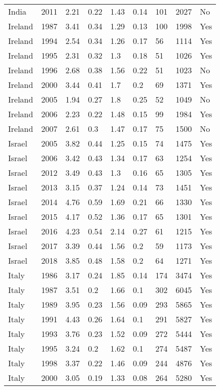 \begin{tabular}{lllllllll}
India & 2011 & 2.21 & 0.22 & 1.43 & 0.14 & 101 & 2027 & No \\ 
Ireland & 1987 & 3.41 & 0.34 & 1.29 & 0.13 & 100 & 1998 & Yes \\ 
Ireland & 1994 & 2.54 & 0.34 & 1.26 & 0.17 & 56 & 1114 & Yes \\ 
Ireland & 1995 & 2.31 & 0.32 & 1.3 & 0.18 & 51 & 1026 & Yes \\ 
Ireland & 1996 & 2.68 & 0.38 & 1.56 & 0.22 & 51 & 1023 & No \\ 
Ireland & 2000 & 3.44 & 0.41 & 1.7 & 0.2 & 69 & 1371 & Yes \\ 
Ireland & 2005 & 1.94 & 0.27 & 1.8 & 0.25 & 52 & 1049 & No \\ 
Ireland & 2006 & 2.23 & 0.22 & 1.48 & 0.15 & 99 & 1984 & Yes \\ 
Ireland & 2007 & 2.61 & 0.3 & 1.47 & 0.17 & 75 & 1500 & No \\ 
Israel & 2005 & 3.82 & 0.44 & 1.25 & 0.15 & 74 & 1475 & Yes \\ 
Israel & 2006 & 3.42 & 0.43 & 1.34 & 0.17 & 63 & 1254 & Yes \\ 
Israel & 2012 & 3.49 & 0.43 & 1.3 & 0.16 & 65 & 1305 & Yes \\ 
Israel & 2013 & 3.15 & 0.37 & 1.24 & 0.14 & 73 & 1451 & Yes \\ 
Israel & 2014 & 4.76 & 0.59 & 1.69 & 0.21 & 66 & 1330 & Yes \\ 
Israel & 2015 & 4.17 & 0.52 & 1.36 & 0.17 & 65 & 1301 & Yes \\ 
Israel & 2016 & 4.23 & 0.54 & 2.14 & 0.27 & 61 & 1215 & Yes \\ 
Israel & 2017 & 3.39 & 0.44 & 1.56 & 0.2 & 59 & 1173 & Yes \\ 
Israel & 2018 & 3.85 & 0.48 & 1.58 & 0.2 & 64 & 1271 & Yes \\ 
Italy & 1986 & 3.17 & 0.24 & 1.85 & 0.14 & 174 & 3474 & Yes \\ 
Italy & 1987 & 3.51 & 0.2 & 1.66 & 0.1 & 302 & 6045 & Yes \\ 
Italy & 1989 & 3.95 & 0.23 & 1.56 & 0.09 & 293 & 5865 & Yes \\ 
Italy & 1991 & 4.43 & 0.26 & 1.64 & 0.1 & 291 & 5827 & Yes \\ 
Italy & 1993 & 3.76 & 0.23 & 1.52 & 0.09 & 272 & 5444 & Yes \\ 
Italy & 1995 & 3.24 & 0.2 & 1.62 & 0.1 & 274 & 5487 & Yes \\ 
Italy & 1998 & 3.37 & 0.22 & 1.46 & 0.09 & 244 & 4876 & Yes \\ 
Italy & 2000 & 3.05 & 0.19 & 1.33 & 0.08 & 264 & 5280 & Yes \\ 

\end{tabular}
